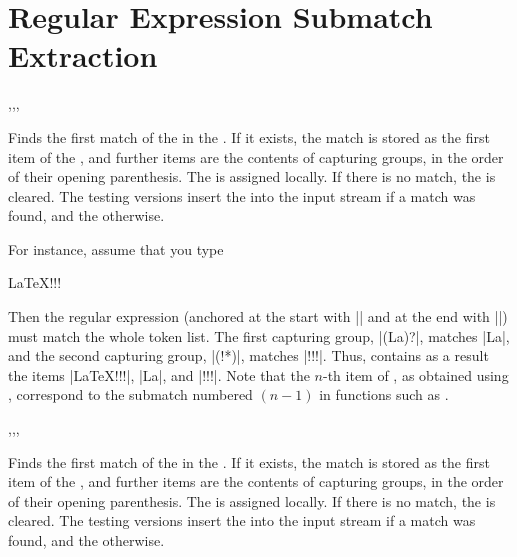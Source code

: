 \documentclass[oneside]{book}
\begin{document}
\section{Regular Expression Submatch Extraction}

\begin{function}{\regexExtractOnce,\regexExtractOnceT,\regexExtractOnceF,\regexExtractOnceTF}
\begin{syntax}
   
    
    
     
\end{syntax}
Finds the first match of the  in the
. If it exists, the match is stored as the first
item of the , and further items are the contents of
capturing groups, in the order of their opening parenthesis. The
 is assigned locally. If there is no match, the
 is cleared.  The testing versions insert the
 into the input stream if a match was found, and the
 otherwise.
\par
For instance, assume that you type
\begin{codehigh}
 {LaTeX!!!} \lTmpaSeq
\end{codehigh}
Then the regular expression (anchored at the start with |\A| and
at the end with |\Z|) must match the whole token list. The first
capturing group, |(La)?|, matches |La|, and the second capturing
group, |(!*)|, matches |!!!|. Thus,  contains as a result
the items |{LaTeX!!!}|, |{La}|, and |{!!!}|.
Note that the $n$-th item of , as obtained using
, correspond to the submatch numbered $(n-1)$ in
functions such as .
\end{function}

\begin{function}{\regexVarExtractOnce,\regexVarExtractOnceT,\regexVarExtractOnceF,\regexVarExtractOnceTF}
\begin{syntax}
   
    
    
     
\end{syntax}
Finds the first match of the  in the
. If it exists, the match is stored as the first
item of the , and further items are the contents of
capturing groups, in the order of their opening parenthesis. The
 is assigned locally. If there is no match, the
 is cleared.  The testing versions insert the
 into the input stream if a match was found, and the
 otherwise.
\end{function}
\end{document}
